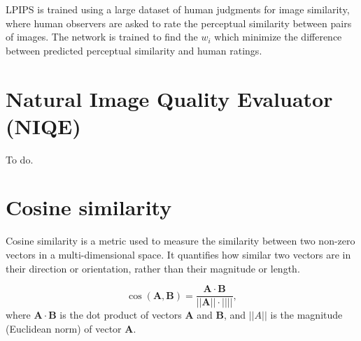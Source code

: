 LPIPS is trained using a large dataset of human judgments for image
similarity, where human observers are asked to rate the perceptual
similarity between pairs of images. The network is trained to find the
$w_i$ which minimize the difference between predicted perceptual
similarity and human ratings.


\section{Natural Image Quality Evaluator (NIQE)}

To do.


\section{Cosine similarity}
Cosine similarity is a metric used to measure the similarity between
two non-zero vectors in a multi-dimensional space. It quantifies how
similar two vectors are in their direction or orientation, rather than
their magnitude or length.

\begin{equation}
  \cos(\mathbf{A}, \mathbf{B}) = \frac{\mathbf{A}\cdot\mathbf{B}}{||\mathbf{A}||\cdot||\mathbf{}||},
\end{equation}
where $\mathbf{A}\cdot\mathbf{B}$ is the dot product of vectors
$\mathbf{A}$ and $\mathbf{B}$, and $||A||$ is the magnitude (Euclidean
norm) of vector $\mathbf{A}$.
